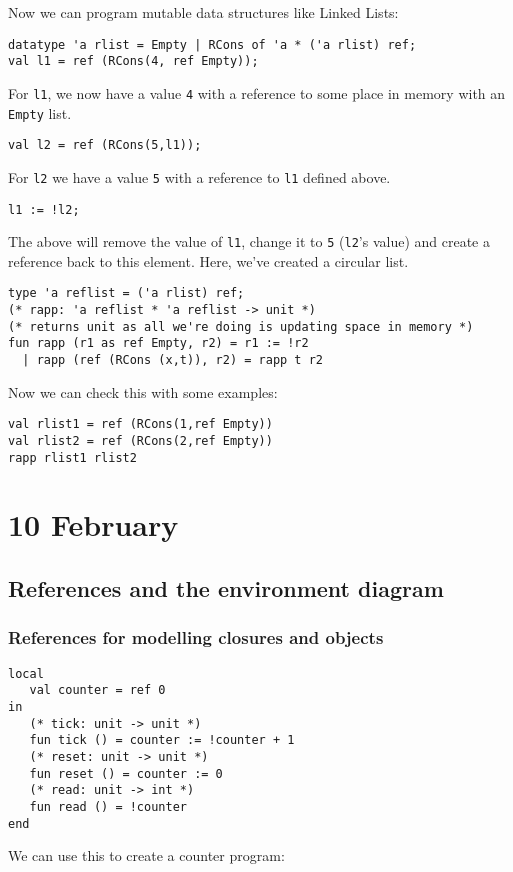 \documentclass[11pt]{article}
\begin{document}
Now we can program mutable data structures like Linked Lists:
\begin{verbatim}
datatype 'a rlist = Empty | RCons of 'a * ('a rlist) ref;
val l1 = ref (RCons(4, ref Empty));
\end{verbatim}
For \verb~l1~, we now have a value \verb~4~ with a reference to some place in memory with an \verb~Empty~ list.
\begin{verbatim}
val l2 = ref (RCons(5,l1));
\end{verbatim}
For \verb~l2~ we have a value \verb~5~ with a reference to \verb~l1~ defined above.
\begin{verbatim}
l1 := !l2;
\end{verbatim}
The above will remove the value of \verb~l1~, change it to \verb~5~ (\verb~l2~'s value) and create a reference back to this element. Here, we've created a circular list.
\begin{verbatim}
type 'a reflist = ('a rlist) ref;
(* rapp: 'a reflist * 'a reflist -> unit *)
(* returns unit as all we're doing is updating space in memory *)
fun rapp (r1 as ref Empty, r2) = r1 := !r2
  | rapp (ref (RCons (x,t)), r2) = rapp t r2
\end{verbatim}
Now we can check this with some examples:
\begin{verbatim}
val rlist1 = ref (RCons(1,ref Empty))
val rlist2 = ref (RCons(2,ref Empty))
rapp rlist1 rlist2
\end{verbatim}


\section{10 February}
\subsection{References and the environment diagram}
\subsubsection{References for modelling closures and objects}
\begin{verbatim}
local
   val counter = ref 0
in
   (* tick: unit -> unit *)
   fun tick () = counter := !counter + 1
   (* reset: unit -> unit *)
   fun reset () = counter := 0
   (* read: unit -> int *)
   fun read () = !counter
end
\end{verbatim}

We can use this to create a counter program:
\end{document}
